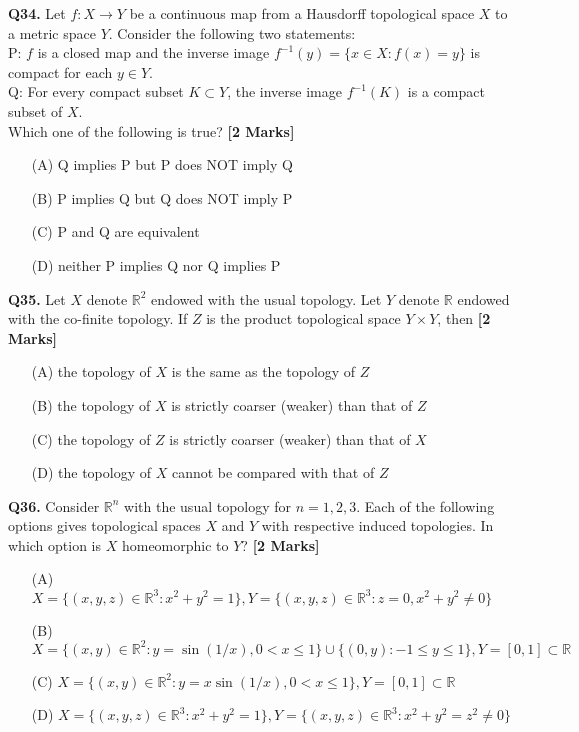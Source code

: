 \documentclass[11pt]{article}
\newcommand{\questionb}[2]{
    \noindent\textbf{Q#2.} #1 \hfill \textbf{[2 Marks]}
}
\begin{document}
\questionb{Let \( f : X \to Y \) be a continuous map from a Hausdorff topological space \( X \) to a metric space \( Y \). Consider the following two statements: \\
P: \( f \) is a closed map and the inverse image \( f^{-1}(y) = \{x \in X : f(x) = y\} \) is compact for each \( y \in Y \). \\
Q: For every compact subset \( K \subset Y \), the inverse image \( f^{-1}(K) \) is a compact subset of \( X \). \\
Which one of the following is true?}{34}
\begin{enumerate}
    \item[(A)] Q implies P but P does NOT imply Q
    \item[(B)] P implies Q but Q does NOT imply P
    \item[(C)] P and Q are equivalent
    \item[(D)] neither P implies Q nor Q implies P
\end{enumerate}
\vspace{0.5cm}

\questionb{Let \( X \) denote \( \mathbb{R}^2 \) endowed with the usual topology. Let \( Y \) denote \( \mathbb{R} \) endowed with the co-finite topology. If \( Z \) is the product topological space \( Y \times Y \), then}{35}
\begin{enumerate}
    \item[(A)] the topology of \( X \) is the same as the topology of \( Z \)
    \item[(B)] the topology of \( X \) is strictly coarser (weaker) than that of \( Z \)
    \item[(C)] the topology of \( Z \) is strictly coarser (weaker) than that of \( X \)
    \item[(D)] the topology of \( X \) cannot be compared with that of \( Z \)
\end{enumerate}
\vspace{0.5cm}

\questionb{Consider \( \mathbb{R}^n \) with the usual topology for \( n = 1, 2, 3 \). Each of the following options gives topological spaces \( X \) and \( Y \) with respective induced topologies. In which option is \( X \) homeomorphic to \( Y \)?}{36}
\begin{enumerate}
    \item[(A)] \( X = \{(x, y, z) \in \mathbb{R}^3 : x^2 + y^2 = 1\}, Y = \{(x, y, z) \in \mathbb{R}^3 : z = 0, x^2 + y^2 \neq 0\} \)
    \item[(B)] \( X = \{(x, y) \in \mathbb{R}^2 : y = \sin(1/x), 0 < x \le 1\} \cup \{(0, y) : -1 \le y \le 1\}, Y = [0, 1] \subset \mathbb{R} \)
    \item[(C)] \( X = \{(x, y) \in \mathbb{R}^2 : y = x \sin(1/x), 0 < x \le 1\}, Y = [0, 1] \subset \mathbb{R} \)
    \item[(D)] \( X = \{(x, y, z) \in \mathbb{R}^3 : x^2 + y^2 = 1\}, Y = \{(x, y, z) \in \mathbb{R}^3 : x^2 + y^2 = z^2 \neq 0\} \)
\end{enumerate}
\vspace{0.5cm}
\end{document}
